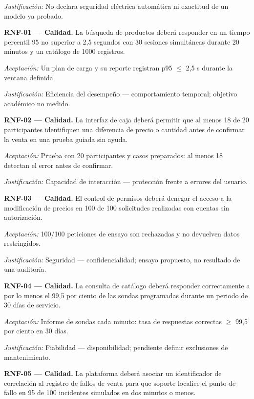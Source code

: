 \noindent\textit{Justificación:} No declara seguridad eléctrica automática ni exactitud de un modelo ya probado.\par\medskip
\noindent\textbf{RNF-01 — Calidad.} La búsqueda de productos deberá responder en un tiempo percentil 95 no superior a 2,5 segundos con 30 sesiones simultáneas durante 20 minutos y un catálogo de 1000 registros.\par
\noindent\textit{Aceptación:} Un plan de carga y su reporte registran p95 $\leq$ 2,5 s durante la ventana definida.\par
\noindent\textit{Justificación:} Eficiencia del desempeño — comportamiento temporal; objetivo académico no medido.\par\medskip
\noindent\textbf{RNF-02 — Calidad.} La interfaz de caja deberá permitir que al menos 18 de 20 participantes identifiquen una diferencia de precio o cantidad antes de confirmar la venta en una prueba guiada sin ayuda.\par
\noindent\textit{Aceptación:} Prueba con 20 participantes y casos preparados: al menos 18 detectan el error antes de confirmar.\par
\noindent\textit{Justificación:} Capacidad de interacción — protección frente a errores del usuario.\par\medskip
\noindent\textbf{RNF-03 — Calidad.} El control de permisos deberá denegar el acceso a la modificación de precios en 100 de 100 solicitudes realizadas con cuentas sin autorización.\par
\noindent\textit{Aceptación:} 100/100 peticiones de ensayo son rechazadas y no devuelven datos restringidos.\par
\noindent\textit{Justificación:} Seguridad — confidencialidad; ensayo propuesto, no resultado de una auditoría.\par\medskip
\noindent\textbf{RNF-04 — Calidad.} La consulta de catálogo deberá responder correctamente a por lo menos el 99,5 por ciento de las sondas programadas durante un periodo de 30 días de servicio.\par
\noindent\textit{Aceptación:} Informe de sondas cada minuto: tasa de respuestas correctas $\geq$ 99,5 por ciento en 30 días.\par
\noindent\textit{Justificación:} Fiabilidad — disponibilidad; pendiente definir exclusiones de mantenimiento.\par\medskip
\noindent\textbf{RNF-05 — Calidad.} La plataforma deberá asociar un identificador de correlación al registro de fallos de venta para que soporte localice el punto de fallo en 95 de 100 incidentes simulados en dos minutos o menos.\par
